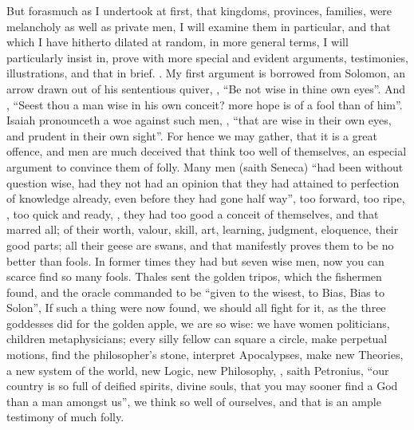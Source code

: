 But forasmuch as I undertook at first, that kingdoms, provinces, families, were
melancholy as well as private men, I will examine them in particular, and that
which I have hitherto dilated at random, in more general terms, I will
particularly insist in, prove with more special and evident arguments,
testimonies, illustrations, and that in brief. . My first argument is borrowed from
Solomon, an arrow drawn out of his sententious quiver, , \enquote{Be not wise in thine own eyes}. And , \enquote{Seest thou a man
wise in his own conceit? more hope is of a fool than of him}. Isaiah
pronounceth a woe against such men, , \enquote{that are wise
in their own eyes, and prudent in their own sight}. For hence we may gather,
that it is a great offence, and men are much deceived that think too well of
themselves, an especial argument to convince them of folly. Many men (saith
Seneca) \enquote{had been without question wise, had they not had
an opinion that they had attained to perfection of knowledge already, even
before they had gone half way}, too forward, too ripe, , too
quick and ready, , they had
too good a conceit of themselves, and that marred all; of their worth, valour,
skill, art, learning, judgment, eloquence, their good parts; all their geese
are swans, and that manifestly proves them to be no better than fools. In
former times they had but seven wise men, now you can scarce find so many
fools. Thales sent the golden tripos, which the fishermen found, and the oracle
commanded to be \enquote{given to the wisest, to Bias, Bias to
Solon}, \etc{} If such a thing were now found, we should all fight for it, as
the three goddesses did for the golden apple, we are so wise: we have women
politicians, children metaphysicians; every silly fellow can square a circle,
make perpetual motions, find the philosopher's stone, interpret Apocalypses,
make new Theories, a new system of the world, new Logic, new Philosophy, \etc{}
, saith Petronius, \enquote{our country is
so full of deified spirits, divine souls, that you may sooner find a God than a
man amongst us}, we think so well of ourselves, and that is an ample testimony
of much folly.

